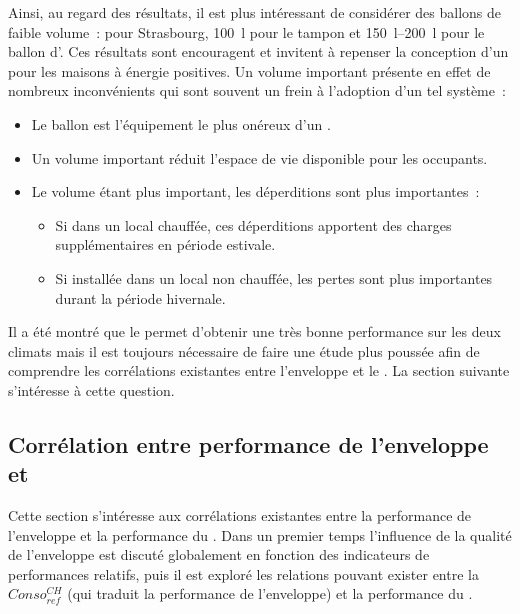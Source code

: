 Ainsi, au regard des résultats, il est plus intéressant de considérer des ballons
de faible volume~: pour Strasbourg, \SI{100}{\litre} pour le tampon et \SIrange{150}{200}{\litre} pour le ballon d’.
Ces résultats sont encouragent et invitent à repenser la conception d’un  pour
les maisons à énergie positives.
Un volume important présente en effet de nombreux inconvénients qui sont souvent un frein
à l’adoption d’un tel système~:
\begin{itemize}
    \item Le ballon est l’équipement le plus onéreux d’un .
    \item Un volume important réduit l’espace de vie disponible pour les occupants.
    \item Le volume étant plus important, les déperditions sont plus importantes~:
    \begin{itemize}
        \item Si dans un local chauffée, ces déperditions apportent des charges supplémentaires
              en période estivale.
        \item Si installée dans un local non chauffée, les pertes sont plus importantes
              durant la période hivernale.
    \end{itemize}
\end{itemize}

Il a été montré que le  permet d’obtenir une très bonne performance sur les deux
climats mais il est toujours nécessaire de faire une étude plus poussée afin de comprendre
les corrélations existantes entre l’enveloppe et le . La section suivante
s’intéresse à cette question.



\subsection{Corrélation entre performance de l’enveloppe et } %
\label{sub:correlation_entre_performance_de_l_enveloppe_et_ssc}
Cette section s’intéresse aux corrélations existantes entre la performance de l’enveloppe
et la performance du . Dans un premier temps l’influence de la qualité de
l’enveloppe est discuté globalement en fonction des indicateurs de performances relatifs,
puis il est exploré les relations pouvant exister entre la $Conso_{ref}^{CH}$ (qui traduit
la performance de l’enveloppe) et la performance du .

